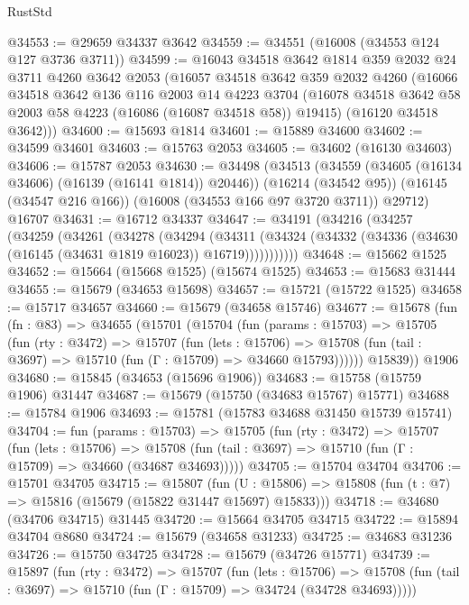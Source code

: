 \begin{lexlean}{RustStd}
\begin{coremodule}
@34553 := @29659 @34337 @3642
@34559 := @34551 (@16008 (@34553 @124 @127 @3736 @3711))
@34599 := @16043
    @34518
    @3642
    @1814
    @359
    @2032
    @24
    @3711
    @4260
    @3642
    @2053
    (@16057
      @34518
      @3642
      @359
      @2032
      @4260
      (@16066
        @34518
        @3642
        @136
        @116
        @2003
        @14
        @4223
        @3704
        (@16078 @34518 @3642 @58 @2003 @58 @4223 (@16086 (@16087 @34518 @58)) @19415)
        (@16120 @34518 @3642)))
@34600 := @15693 @1814
@34601 := @15889 @34600
@34602 := @34599 @34601
@34603 := @15763 @2053
@34605 := @34602 (@16130 @34603)
@34606 := @15787 @2053
@34630 := @34498
    (@34513
      (@34559 (@34605 (@16134 @34606) (@16139 (@16141 @1814)) @20446))
      (@16214 (@34542 @95))
      (@16145 (@34547 @216 @166))
      (@16008 (@34553 @166 @97 @3720 @3711))
      @29712)
    @16707
@34631 := @16712 @34337
@34647 := @34191
    (@34216
      (@34257
        (@34259
          (@34261
            (@34278
              (@34294
                (@34311
                  (@34324 (@34332 (@34336 (@34630 (@16145 (@34631 @1819 @16023)) @16719)))))))))))
@34648 := @15662 @1525
@34652 := @15664 (@15668 @1525) (@15674 @1525)
@34653 := @15683 @31444
@34655 := @15679 (@34653 @15698)
@34657 := @15721 (@15722 @1525)
@34658 := @15717 @34657
@34660 := @15679 (@34658 @15746)
@34677 := @15678
    (fun (fn : @83) =>
    @34655
      (@15701
        (@15704
          (fun (params : @15703) =>
          @15705
            (fun (rty : @3472) =>
            @15707
              (fun (lets : @15706) =>
              @15708 (fun (tail : @3697) => @15710 (fun (Γ : @15709) => @34660 @15793))))))
        @15839))
    @1906
@34680 := @15845 (@34653 (@15696 @1906))
@34683 := @15758 (@15759 @1906) @31447
@34687 := @15679 (@15750 (@34683 @15767) @15771)
@34688 := @15784 @1906
@34693 := @15781 (@15783 @34688 @31450 @15739 @15741)
@34704 := fun (params : @15703) =>
  @15705
    (fun (rty : @3472) =>
    @15707
      (fun (lets : @15706) =>
      @15708 (fun (tail : @3697) => @15710 (fun (Γ : @15709) => @34660 (@34687 @34693)))))
@34705 := @15704 @34704
@34706 := @15701 @34705
@34715 := @15807
    (fun (U : @15806) => @15808 (fun (t : @7) => @15816 (@15679 (@15822 @31447 @15697) @15833)))
@34718 := @34680 (@34706 @34715) @31445
@34720 := @15664 @34705 @34715
@34722 := @15894 @34704 @8680
@34724 := @15679 (@34658 @31233)
@34725 := @34683 @31236
@34726 := @15750 @34725
@34728 := @15679 (@34726 @15771)
@34739 := @15897
    (fun (rty : @3472) =>
    @15707
      (fun (lets : @15706) =>
      @15708 (fun (tail : @3697) => @15710 (fun (Γ : @15709) => @34724 (@34728 @34693)))))

\end{coremodule}
\end{lexlean}
